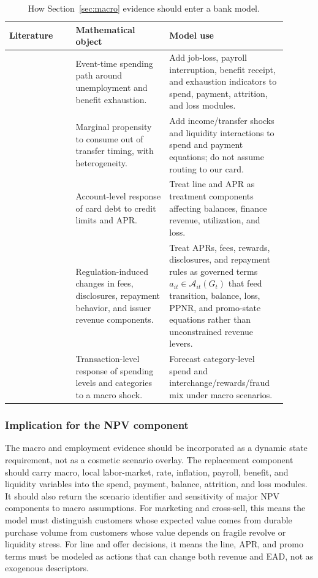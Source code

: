 \documentclass[11pt]{article}
\newcommand{\1}{\mathbf{1}}
\begin{document}
\begin{table}[t]
\centering
\caption{How Section~\ref{sec:macro} evidence should enter a bank model.}
\label{tab:macro-to-model}
\begin{tabular}{p{0.22\linewidth}p{0.31\linewidth}p{0.37\linewidth}}
\toprule
Literature & Mathematical object & Model use \\
\midrule
\citet{ganong2019unemployment}
  & Event-time spending path around unemployment and benefit exhaustion.
  & Add job-loss, payroll interruption, benefit receipt, and exhaustion
    indicators to spend, payment, attrition, and loss modules. \\
\citet{johnson2004rebates}
  & Marginal propensity to consume out of transfer timing, with heterogeneity.
  & Add income/transfer shocks and liquidity interactions to spend and payment
    equations; do not assume routing to our card. \\
\citet{gross2001liquidity}
  & Account-level response of card debt to credit limits and APR.
  & Treat line and APR as treatment components affecting balances, finance
    revenue, utilization, and loss. \\
\citet{agarwal2013cardact}
  & Regulation-induced changes in fees, disclosures, repayment behavior, and
    issuer revenue components.
  & Treat APRs, fees, rewards, disclosures, and repayment rules as governed
    terms $a_{it}\in\mathcal{A}_{it}(G_t)$ that feed transition, balance, loss,
    PPNR, and promo-state equations rather than unconstrained revenue levers. \\
\citet{baker2020epidemic}
  & Transaction-level response of spending levels and categories to a macro
    shock.
  & Forecast category-level spend and interchange/rewards/fraud mix under
    macro scenarios. \\
\bottomrule
\end{tabular}
\end{table}

\subsubsection{Implication for the NPV component}
\label{subsec:macro-component-implication}

The macro and employment evidence should be incorporated as a dynamic state
requirement, not as a cosmetic scenario overlay. The replacement component
should carry macro, local labor-market, rate, inflation, payroll, benefit, and
liquidity variables into the spend, payment, balance, attrition, and loss
modules. It should also return the scenario identifier and sensitivity of
major NPV components to macro assumptions. For marketing and cross-sell, this
means the model must distinguish customers whose expected value comes from
durable purchase volume from customers whose value depends on fragile revolve
or liquidity stress. For line and offer decisions, it means the line, APR, and
promo terms must be modeled as actions that can change both revenue and EAD,
not as exogenous descriptors.
\end{document}
